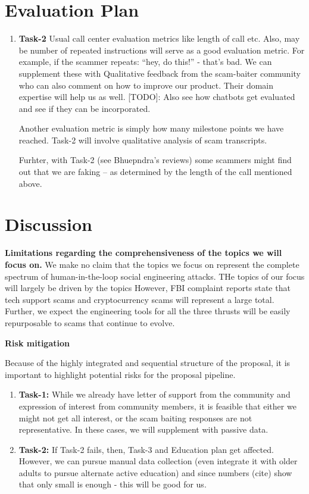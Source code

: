 \section{Evaluation Plan}
\label{sec:evaluation_plan}

\begin{enumerate}
\item \textbf{Task-2} Usual call center evaluation metrics like length of call etc. Also, may be number of repeated instructions will serve as a good evaluation metric. For example, if the scammer repeats: ``hey, do this!'' - that's bad. We can supplement these with Qualitative feedback from the scam-baiter community who can also comment on how to improve our product. Their domain expertise will help us as well.
[TODO]: Also see how chatbots get evaluated and see if they can be incorporated.

Another evaluation metric is simply how many milestone points we have reached. Task-2 will involve qualitative analysis of scam transcripts. 

Furhter, with Task-2 (see Bhuepndra's reviews) some scammers might find out that we are faking -- as determined by the length of the call mentioned above. 



\end{enumerate}

\section{Discussion}
\label{sec:discussion}

\textbf{Limitations regarding the comprehensiveness of the topics we will focus on.} We make no claim that the topics we focus on represent the complete spectrum of human-in-the-loop social engineering attacks. THe topics of our focus will largely be driven by the topics However, FBI complaint reports state that tech support scams and cryptocurrency scams will represent a large total. Further, we expect the engineering tools for all the three thrusts will be easily repurposable to scams that continue to evolve. 


\textbf{Risk mitigation}

Because of the highly integrated and sequential structure of the proposal, it is important to highlight potential risks for the proposal pipeline.

\begin{enumerate}
    \item \textbf{Task-1:} While we already have letter of support from the community and expression of interest from community members, it is feasible that either we might not get all interest, or the scam baiting responses are not representative. In these cases, we will supplement with passive data.
    \item \textbf{Task-2:} If Task-2 fails, then, Task-3 and Education plan get affected. However, we can pursue manual data collection (even integrate it with older adults to pursue alternate active education) and since numbers (cite) show that only small is enough - this will be good for us.
\end{enumerate}


